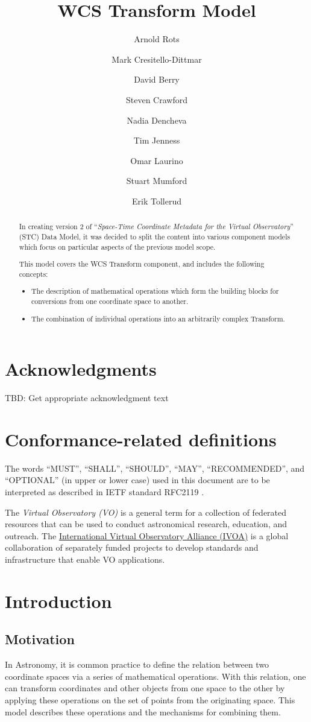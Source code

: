 \documentclass[11pt,a4paper]{ivoa}
\title{WCS Transform Model}
\author{Arnold Rots}
\author{Mark Cresitello-Dittmar}
\author{David Berry}
\author{Steven Crawford}
\author{Nadia Dencheva}
\author{Tim Jenness}
\author{Omar Laurino}
\author{Stuart Mumford}
\author{Erik Tollerud}
\begin{document}
\begin{abstract}
  In creating version 2 of ``\emph{Space-Time Coordinate Metadata for the Virtual Observatory}'' (STC) \citep{std:STC} Data Model, it was decided to split the content into various component models which focus on particular aspects of the previous model scope.  
  
  This model covers the WCS Transform component, and includes the following concepts:
  \begin{itemize}
  \item The description of mathematical operations which form the building blocks for conversions from one coordinate space to another.
  \item The combination of individual operations into an arbitrarily complex Transform.
  \end{itemize}
\end{abstract}

\section*{Acknowledgments}
TBD: Get appropriate acknowledgment text

\section*{Conformance-related definitions}

The words ``MUST'', ``SHALL'', ``SHOULD'', ``MAY'', ``RECOMMENDED'', and
``OPTIONAL'' (in upper or lower case) used in this document are to be
interpreted as described in IETF standard RFC2119 \citep{std:RFC2119}.

The \emph{Virtual Observatory (VO)} is a
general term for a collection of federated resources that can be used
to conduct astronomical research, education, and outreach.
The \href{http://www.ivoa.net}{International
Virtual Observatory Alliance (IVOA)} is a global
collaboration of separately funded projects to develop standards and
infrastructure that enable VO applications.

\section{Introduction}

\subsection{Motivation}
In Astronomy, it is common practice to define the relation between two coordinate spaces via a series of mathematical operations.  
With this relation, one can transform coordinates and other objects from one space to the other by applying these operations on
the set of points from the originating space.  This model describes these operations and the mechanisms for combining them.
\end{document}
